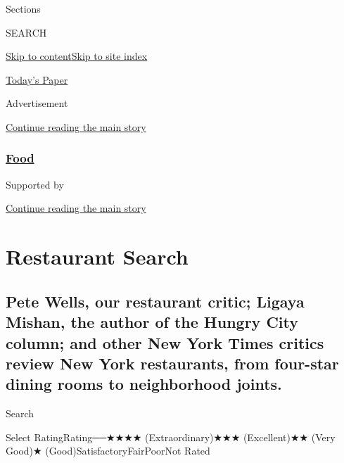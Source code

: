 Sections

SEARCH

\protect\hyperlink{site-content}{Skip to
content}\protect\hyperlink{site-index}{Skip to site index}

\href{https://myaccount.nytimes3xbfgragh.onion/auth/login?response_type=cookie\&client_id=vi}{}

\href{https://www.nytimes3xbfgragh.onion/section/todayspaper}{Today's
Paper}

Advertisement

\protect\hyperlink{after-top}{Continue reading the main story}

\hypertarget{food}{%
\subsubsection{\texorpdfstring{\href{/dining}{Food}}{Food}}\label{food}}

Supported by

\protect\hyperlink{after-sponsor}{Continue reading the main story}

\hypertarget{restaurant-search}{%
\section{Restaurant Search}\label{restaurant-search}}

\hypertarget{pete-wells-our-restaurant-critic-ligaya-mishan-the-author-of-the-hungry-city-column-and-other-new-york-times-critics-review-new-york-restaurants-from-four-star-dining-rooms-to-neighborhood-joints}{%
\subsection{Pete Wells, our restaurant critic; Ligaya Mishan, the author
of the Hungry City column; and other New York Times critics review New
York restaurants, from four-star dining rooms to neighborhood
joints.}\label{pete-wells-our-restaurant-critic-ligaya-mishan-the-author-of-the-hungry-city-column-and-other-new-york-times-critics-review-new-york-restaurants-from-four-star-dining-rooms-to-neighborhood-joints}}

Search

Select RatingRating──★★★★ (Extraordinary)★★★ (Excellent)★★ (Very Good)★
(Good)SatisfactoryFairPoorNot Rated

